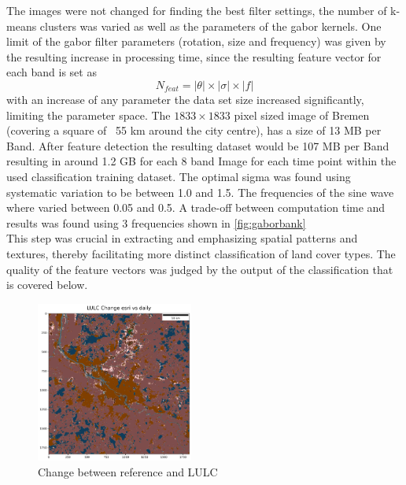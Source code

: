 \documentclass[12pt,a4paper, english,twoside]{article}
\begin{document}
      The images were not changed for finding the best filter settings, the number of k-means clusters was varied as well as the parameters of the gabor kernels. 
      One limit of the gabor filter parameters (rotation, size and frequency) was given by the resulting increase in processing time, since the resulting feature vector for each band is set as  
      \begin{equation}
        N_{feat} = |\theta| \times |\sigma| \times |f| 
      \end{equation}
      with an increase of any parameter the data set size increased significantly, limiting the parameter space. 
    The $1833 \times 1833$ pixel sized image of Bremen (covering a square of ~55 km around the city centre), has a size of 13 MB per Band. 
    After feature detection the resulting dataset would be 107 MB per Band resulting in around 1.2 GB for each 8 band Image for each time point within the used classification training dataset. 
    The optimal sigma was found using systematic variation to be between 1.0 and 1.5. 
    The frequencies of the sine wave where varied between 0.05 and 0.5. 
    A trade-off between computation time and results was found using 3 frequencies shown in \cref{fig:gaborbank} \\ 
    This step was crucial in extracting and emphasizing spatial patterns and textures, thereby facilitating more distinct classification of land cover types.
      The quality of the feature vectors was judged by the output of the classification that is covered below. 
      \newpage
      \begin{figure}
         \begin{center}
         \includegraphics[width=0.46\textwidth]{img/DiffLULC}
       \end{center}
       \caption{Change between reference and LULC}\label{fig:lulcDiff}
      \end{figure}
\end{document}
